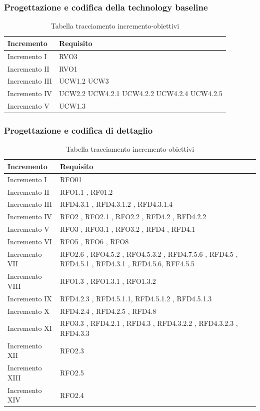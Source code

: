 \documentclass[../piano_di_progetto.tex]{subfiles}
\begin{document}
\subsubsection*{Progettazione e codifica della technology baseline}
\begin{table}[!ht]
	\centering
	\begin{tabular}{|p{3cm}|p{6.5cm}|}
	\hline
	\rowcolor{lightgray}
    \textbf{Incremento} & \textbf{Requisito}\\
    \hline
        Incremento I & RVO3\\
        Incremento II & RVO1\\
        Incremento III & UCW1.2  UCW3 \\
        Incremento IV & UCW2.2 UCW4.2.1 UCW4.2.2 UCW4.2.4 UCW4.2.5\\
        Incremento V & UCW1.3\\
    \hline
    \end{tabular}
    \caption{Tabella tracciamento incremento-obiettivi}
\end{table}

\subsubsection*{Progettazione e codifica di dettaglio}
\begin{table}[!ht]
	\centering
	\begin{tabular}{|p{3cm}|p{6.5cm}|}
	\hline
	\rowcolor{lightgray}
    \textbf{Incremento} & \textbf{Requisito}\\
    \hline
        Incremento I & RFO01 \\
        Incremento II & RFO1.1 , RF01.2 \\
        Incremento III & RFD4.3.1 , RFD4.3.1.2 , RFD4.3.1.4 \\
        Incremento IV & RFO2 , RFO2.1 , RFO2.2 , RFD4.2 , RFD4.2.2 \\
        Incremento V & RFO3 , RFO3.1 , RFO3.2 , RFD4 , RFD4.1 \\	
        Incremento VI &  RFO5 , RFO6 , RFO8 \\
        Incremento VII & RFO2.6 , RFO4.5.2 , RFO4.5.3.2 , RFD4.7.5.6 , RFD4.5 , RFD4.5.1 , RFD4.3.1 , RFD4.5.6, RFF4.5.5 \\
        Incremento VIII & RFO1.3 , RFO1.3.1 , RFO1.3.2 \\
        Incremento IX & RFD4.2.3 , RFD4.5.1.1, RFD4.5.1.2 , RFD4.5.1.3 \\
        Incremento X & RFD4.2.4 , RFD4.2.5 , RFD4.8 \\
        Incremento XI & RFO3.3 , RFD4.2.1  , RFD4.3  , RFD4.3.2.2 , RFD4.3.2.3 , RFD4.3.3 \\
        Incremento XII & RFO2.3 \\
        Incremento XIII & RFO2.5 \\
        Incremento XIV & RFO2.4 \\        
    \hline	
	\end{tabular}
	\caption{Tabella tracciamento incremento-obiettivi}
\end{table}
\end{document}
